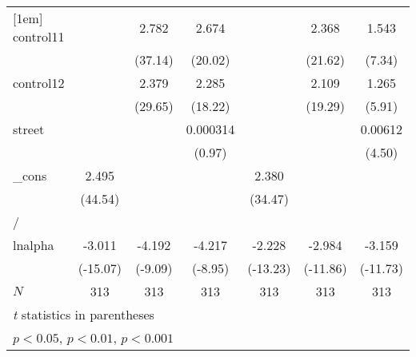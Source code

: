 {\begin{tabular}{l*{6}{c}}
[1em]
control11   &                     &       2.782\sym{***}&       2.674\sym{***}&                     &       2.368\sym{***}&       1.543\sym{***}\\
            &                     &     (37.14)         &     (20.02)         &                     &     (21.62)         &      (7.34)         \\
[1em]
control12   &                     &       2.379\sym{***}&       2.285\sym{***}&                     &       2.109\sym{***}&       1.265\sym{***}\\
            &                     &     (29.65)         &     (18.22)         &                     &     (19.29)         &      (5.91)         \\
[1em]
street      &                     &                     &    0.000314         &                     &                     &     0.00612\sym{***}\\
            &                     &                     &      (0.97)         &                     &                     &      (4.50)         \\
[1em]
\_cons      &       2.495\sym{***}&                     &                     &       2.380\sym{***}&                     &                     \\
            &     (44.54)         &                     &                     &     (34.47)         &                     &                     \\
\hline
/           &                     &                     &                     &                     &                     &                     \\
lnalpha     &      -3.011\sym{***}&      -4.192\sym{***}&      -4.217\sym{***}&      -2.228\sym{***}&      -2.984\sym{***}&      -3.159\sym{***}\\
            &    (-15.07)         &     (-9.09)         &     (-8.95)         &    (-13.23)         &    (-11.86)         &    (-11.73)         \\
\hline
\(N\)       &         313         &         313         &         313         &         313         &         313         &         313         \\
\hline\hline
\multicolumn{7}{l}{\footnotesize \textit{t} statistics in parentheses}\\
\multicolumn{7}{l}{\footnotesize \sym{*} \(p<0.05\), \sym{**} \(p<0.01\), \sym{***} \(p<0.001\)}\\
\end{tabular}
}
